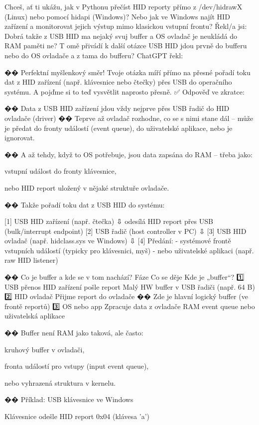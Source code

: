 Chceš, ať ti ukážu, jak v Pythonu přečíst HID reporty přímo z /dev/hidrawX (Linux) nebo pomocí hidapi (Windows)? Nebo jak ve Windows najít HID zařízení a monitorovat jejich výstup mimo klasickou vstupní frontu?
Řekl/a jsi:
Dobrá takže z USB HID ma nejaký svuj buffer a OS ovladač je neukládá do RAM paměti ne? T omě přivádí k další otázce USB HID jdou prvně do bufferu nebo do OS ovladače a z tama do bufferu?
ChatGPT řekl:

�� Perfektní myšlenkový směr!
Tvoje otázka míří přímo na přesné pořadí toku dat z HID zařízení (např. klávesnice nebo čtečky) přes USB do operačního systému. A pojďme si to teď vysvětlit naprosto přesně.
✅ Odpověď ve zkratce:

    �� Data z USB HID zařízení jdou vždy nejprve přes USB řadič do HID ovladače (driver)
    �� Teprve až ovladač rozhodne, co se s nimi stane dál – může je předat do fronty událostí (event queue), do uživatelské aplikace, nebo je ignorovat.

�� A až tehdy, když to OS potřebuje, jsou data zapsána do RAM – třeba jako:

    vstupní událost do fronty klávesnice,

    nebo HID report uložený v nějaké struktuře ovladače.

�� Takže pořadí toku dat z USB HID do systému:

[1] USB HID zařízení (např. čtečka)
   ⇩ odesílá HID report přes USB (bulk/interrupt endpoint)
[2] USB řadič (host controller v PC)
   ⇩
[3] USB HID ovladač (např. hidclass.sys ve Windows)
   ⇩
[4] Předání:
    - systémové frontě vstupních událostí (typicky pro klávesnici, myš)
    - nebo uživatelské aplikaci (např. raw HID listener)

�� Co je buffer a kde se v tom nachází?
Fáze	Co se děje	Kde je „buffer“?
1️⃣ USB přenos	HID zařízení pošle report	Malý HW buffer v USB řadiči (např. 64 B)
2️⃣ HID ovladač	Přijme report do ovladače	�� Zde je hlavní logický buffer (ve frontě reportů)
3️⃣ OS nebo app	Zpracuje data z ovladače	RAM event queue nebo uživatelská aplikace

�� Buffer není RAM jako taková, ale často:

    kruhový buffer v ovladači,

    fronta událostí pro vstupy (input event queue),

    nebo vyhrazená struktura v kernelu.

�� Příklad: USB klávesnice ve Windows

    Klávesnice odešle HID report 0x04 (klávesa 'a')

